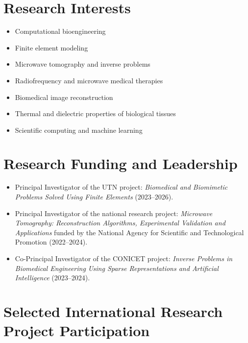 \documentclass[11pt]{article}
\begin{document}
\section*{Research Interests}

\begin{itemize}[leftmargin=*]
    \item Computational bioengineering
    \item Finite element modeling
    \item Microwave tomography and inverse problems
    \item Radiofrequency and microwave medical therapies
    \item Biomedical image reconstruction
    \item Thermal and dielectric properties of biological tissues
    \item Scientific computing and machine learning
\end{itemize}

\section*{Research Funding and Leadership}

\begin{itemize}[leftmargin=*]
    \item Principal Investigator of the UTN project:
    \textit{Biomedical and Biomimetic Problems Solved Using Finite Elements} (2023--2026).

    \item Principal Investigator of the national research project:
    \textit{Microwave Tomography: Reconstruction Algorithms, Experimental Validation and Applications} funded by the National Agency for Scientific and Technological Promotion (2022--2024).

    \item Co-Principal Investigator of the CONICET project:
    \textit{Inverse Problems in Biomedical Engineering Using Sparse Representations and Artificial Intelligence} (2023--2024).
\end{itemize}

\section*{Selected International Research Project Participation}
\end{document}
